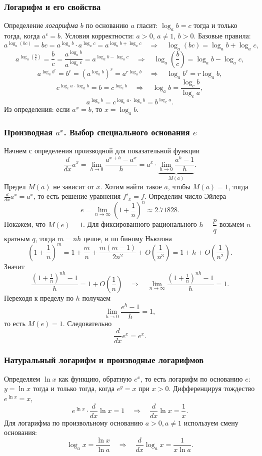 \documentclass[12pt, a4paper]{article}%
\begin{document}
\subsubsection*{Логарифм и его свойства}
Определение \textit{логарифма} $b$ по основанию $a$ гласит: \(\log_a b = c\) тогда и только тогда, когда \(a^c = b\). Условия корректности: \(a>0\), \(a\ne1\), \(b>0\). Базовые правила:
\[
a^{\log_a(bc)} = bc = a^{\log_a b}\cdot a^{\log_a c} = a^{\log_a b+\log_a c} \quad\Longrightarrow\quad \log_a(bc)=\log_a b+\log_a c,
\]
\[
a^{\log_a\!\left(\frac{b}{c}\right)} = \frac{b}{c} = \frac{a^{\log_a b}}{a^{\log_a c}} = a^{\log_a b-\log_a c} \quad\Longrightarrow\quad\log_a\!\left(\frac{b}{c}\right)=\log_a b-\log_a c,
\]
\[
a^{\log_a b^r} = b^r = (a^{\log_a b})^r = a^{r\log_a b} \quad\Longrightarrow\quad \log_a b^r=r\log_a b,\]
\[
c^{\log_c a\cdot\log_a b} = b = c^{\log_c b} \quad\Longrightarrow\quad \log_a b=\frac{\log_c b}{\log_c a},
\]
\[
a^{\log_c b} = c^{\log_c a\cdot\log_c b} = b^{\log_c a}.
\]
Из определения: если \(a^x=b\), то \(x=\log_a b\). 
\subsubsection*{Производная \(a^x\). Выбор специального основания \(e\)}
Начнем с определения производной для показательной функции
\[
\frac{d}{dx}a^x=\lim_{h\to0}\frac{a^{x+h}-a^x}{h}
=a^x\cdot\underbrace{\lim_{h\to0}\frac{a^{h}-1}{h}}_{M(a)}.
\]
Предел \(M(a)\) не зависит от \(x\). Хотим найти такое \(a\), чтобы \(M(a)=1\), тогда \(\frac{d}{dx}a^x=a^x\), то есть решение уравнения \(f'_x=f\).
Определим число Эйлера
\[
e=\lim_{n\to\infty}\left(1+\frac{1}{n}\right)^{n}\approx 2.71828.
\]
Покажем, что \(M(e)=1\). Для фиксированного рационального \(h=\dfrac{p}{q}\) возьмем \(n\) кратным \(q\), тогда \(m=nh\) целое, и по биному Ньютона
\[
\left(1+\frac{1}{n}\right)^{m}=1+\frac{m}{n}+\frac{m(m-1)}{2n^2}+O\!\left(\frac{1}{n^3}\right)
=1+h+O\!\left(\frac{1}{n^2}\right).
\]
Значит
\[
\frac{\left(1+\frac{1}{n}\right)^{nh}-1}{h}=1+O\!\left(\frac{1}{n}\right)\quad \Longrightarrow\quad
\lim_{n\to\infty}\frac{\left(1+\frac{1}{n}\right)^{nh}-1}{h}=1.
\]
Переходя к пределу по \(h\) получаем
\[
\lim_{h\to0}\frac{e^{h}-1}{h}=1,
\]
то есть \(M(e)=1\). Следовательно
\[
\frac{d}{dx}e^x=e^x.
\]

\subsubsection*{Натуральный логарифм и производные логарифмов}
Определяем \(\ln x\) как функцию, обратную \(e^x\), то есть логарифм по основанию $e$: \(y=\ln x\) тогда и только тогда, когда \(e^{y}=x\) при \(x>0\). Дифференцируя тождество \(e^{\ln x}=x\),
\[
e^{\ln x}\cdot\frac{d}{dx}\ln x=1 \quad \Longrightarrow\quad \frac{d}{dx}\ln x=\frac{1}{x}.
\]
Для логарифма по произвольному основанию \(a>0,a\ne1\) используем смену основания:
\[
\log_a x=\frac{\ln x}{\ln a}\quad \Longrightarrow\quad \frac{d}{dx}\log_a x=\frac{1}{x\ln a}.
\]
\end{document}
